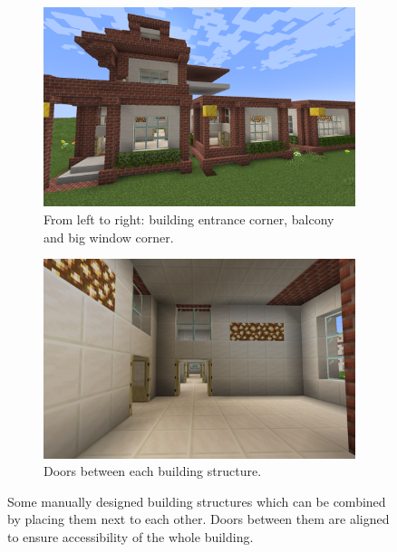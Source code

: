 \documentclass[
oneside,
fontsize=11pt
]{scrartcl}
\begin{document}
\begin{figure}[ht]
  \centering
  \begin{subfigure}{0.48\textwidth}
    \includegraphics[width=\textwidth]{images/structures/building-strucutres-close-up.png}
    \caption{From left to right: building entrance corner, balcony and big window corner.}
    \label{fig_building_strucutres_close_up}
  \end{subfigure}
  \hfill
  \begin{subfigure}{0.48\textwidth}
      \includegraphics[width=\textwidth]{images/structures/building-strucutres-doors.png}
      \caption{Doors between each building structure.}
  \end{subfigure}
  \caption{Some manually designed building structures 
    which can be combined by placing them next to each other. 
    Doors between them are aligned to ensure accessibility of the whole building.}
  \label{fig_building_strucutres}
\end{figure}
\end{document}
